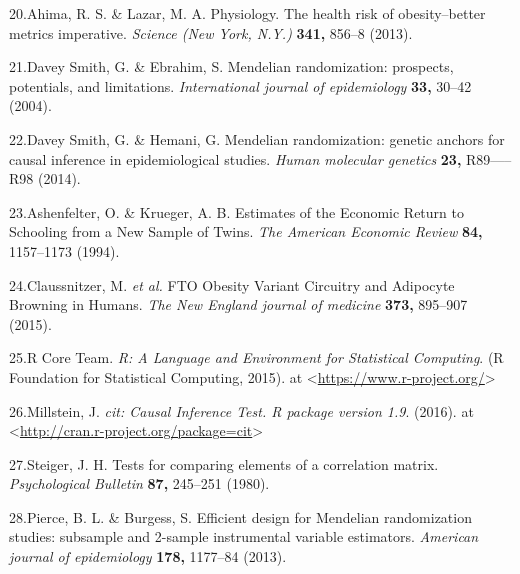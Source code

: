 \documentclass[]{article}
\begin{document}
20.Ahima, R. S. \& Lazar, M. A. Physiology. The health risk of
obesity--better metrics imperative. \emph{Science (New York, N.Y.)}
\textbf{341,} 856--8 (2013).

21.{Davey Smith}, G. \& Ebrahim, S. Mendelian randomization: prospects,
potentials, and limitations. \emph{International journal of
epidemiology} \textbf{33,} 30--42 (2004).

22.{Davey Smith}, G. \& Hemani, G. Mendelian randomization: genetic
anchors for causal inference in epidemiological studies. \emph{Human
molecular genetics} \textbf{23,} R89-----R98 (2014).

23.Ashenfelter, O. \& Krueger, A. B. Estimates of the Economic Return to
Schooling from a New Sample of Twins. \emph{The American Economic
Review} \textbf{84,} 1157--1173 (1994).

24.Claussnitzer, M. \emph{et al.} FTO Obesity Variant Circuitry and
Adipocyte Browning in Humans. \emph{The New England journal of medicine}
\textbf{373,} 895--907 (2015).

25.R Core Team. \emph{R: A Language and Environment for Statistical
Computing}. (R Foundation for Statistical Computing, 2015). at
\textless{}\url{https://www.r-project.org/}\textgreater{}

26.Millstein, J. \emph{cit: Causal Inference Test. R package version
1.9}. (2016). at
\textless{}\url{http://cran.r-project.org/package=cit}\textgreater{}

27.Steiger, J. H. Tests for comparing elements of a correlation matrix.
\emph{Psychological Bulletin} \textbf{87,} 245--251 (1980).

28.Pierce, B. L. \& Burgess, S. Efficient design for Mendelian
randomization studies: subsample and 2-sample instrumental variable
estimators. \emph{American journal of epidemiology} \textbf{178,}
1177--84 (2013).
\end{document}
